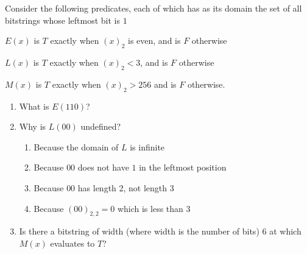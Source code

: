 
Consider the following predicates, each of which has 
as its domain the set of all bitstrings whose leftmost bit is $1$

$E(x)$ is $T$ exactly when $(x)_{2}$ is even, and is $F$ otherwise

$L(x)$ is $T$ exactly when $(x)_2 < 3$, and is $F$ otherwise

$M(x)$ is $T$ exactly when $(x)_2 > 256$ and is $F$ otherwise.

\begin{enumerate}
\item What is $E(110)$?
\item Why is $L(00)$ undefined?
\begin{enumerate}
\item Because the domain of $L$ is infinite
\item Because $00$ does not have $1$ in the leftmost position
\item Because $00$ has length 2, not length 3
\item Because $(00)_{2,2} = 0$ which is less than $3$
\end{enumerate}
\item Is there a bitstring of width (where width is the number of bits) $6$ at which $M(x)$ evaluates 
to $T$?
\end{enumerate}